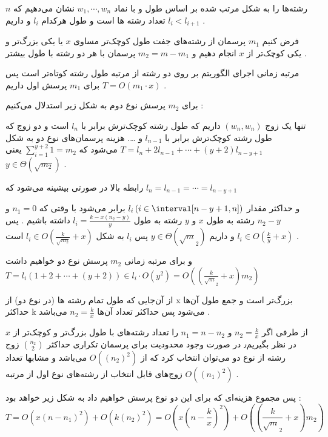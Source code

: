 رشته‌ها را به شکل مرتب شده بر اساس طول و با نماد 
$w_1, \cdots, w_n$
نشان می‌دهیم که 
$n$ 
تعداد رشته ها است و 
طول هرکدام 
$l_i$
و داریم  
$l_i < l_{i+1}$
.

فرض کنیم 
$m_1$
پرسمان از رشته‌های جفت طول کوچک‌تر مساوی  
$x$
یا 
یکی بزرگ‌تر و یکی کوچک‌تر از 
$x$
انجام دهیم و 
$m_2 = m - m_1$
پرسمان با هر دو رشته با طول بیشتر
.

مرتبه زمانی 
اجرای الگوریتم بر روی دو رشته از مرتبه طول رشته کوتاه‌تر است پس برای 
$m_1$
پرسش اول داریم 
$T = O(m_1 \cdot x)$
.

برای 
$m_2$
پرسش نوع دوم به شکل زیر استدلال می‌کنیم
:

تنها 
یک زوج
$(w_n,w_n)$
داریم که طول رشته کوچک‌ترش برابر با 
$l_n$
است و دو زوج
که 
طول رشته کوچک‌ترش برابر با 
$l_{n-1}$
و \dots.
هزینه پرسمان‌های نوع دو به شکل 
$T = l_{n} + 2 l_{n-1} + \cdots + (y+2)l_{n-y+1}$
می‌شود
که 
$\sum_{i=1}^{y+2} 1 = m_2$
یعنی 
$y \in \Theta(\sqrt{m_2})$
.


رابطه بالا در صورتی بیشینه می‌شود که 
$l_n = l_{n-1} = \cdots = l_{n-y+1}$

و حداکثر مقدار 
$l_i \left(i \in \interval[n-y+1, n] \right)$
برابر می‌شود با وقتی که 
$n_1 = 0$
و
$n_2 - y$
رشته به طول 
$x$ 
و 
$y$ 
رشته به طول 
\newline
$l_i = \frac{k-x(n_2-y)}{y}$
داشته باشیم 
.
پس 
$l_i \in O(\frac{k}{y}+x)$
و داریم 
$y \in \Theta (\sqrt m_2)$
پس 
$l_i$
به شکل 
$l_i \in O(\frac{k}{\sqrt{m_2}}+x)$
است
.   

و
برای مرتبه زمانی 
$m_2$
پرسش‌ نوع دو خواهیم داشت
$T = l_i (1 + 2 + \cdots + (y+2)) \in l_i \cdot O(y^2) = O((\frac{k}{\sqrt m_2}+x)m_2)$

از آن‌جایی که طول تمام رشته ها (در نوع دو)‌ از 
x
بزرگ‌تر است و
جمع طول آن‌ها حداکثر 
k 
می‌شود پس حداکثر 
تعداد آن‌ها
$n_2 = \frac{k}{x}$
می‌باشد
.

از طرفی
اگر 
$n_2 = \frac{k}{x}$
و 
$n_1 = n - n_2$
را تعداد رشته‌های با طول بزرگ‌تر و کوچک‌تر از 
$x$
در نظر بگیریم٫
در صورت وجود محدودیت برای پرسمان تکراری حداکثر
$n_2\choose 2$
زوج
رشته از نوع دو می‌توان انتخاب کرد
که از 
$O((n_2)^2)$
می‌باشد
و
مشابها تعداد زوج‌های قابل انتخاب از رشته‌های نوع اول 
از مرتبه 
$O((n_1)^2)$
.


پس مجموع هزینه‌ای که برای این دو نوع پرسش خواهیم داد به شکل زیر خواهد بود
:
\begin{equation*}
    T = O(x (n-n_1)^2) + O(k(n_2)^2) = O(x (n-\frac{k}{x})^2) + O((\frac{k}{\sqrt m_2}+x)m_2)
\end{equation*}

